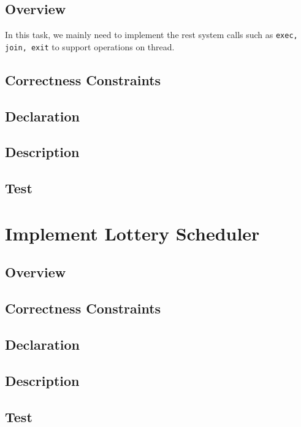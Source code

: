 \documentclass{article}
\begin{document}
\subsection{Overview}
In this task, we mainly need to implement the rest system calls such as \texttt{exec, join, exit} to support operations on thread.
\subsection{Correctness Constraints}
\begin{compactitem}
\item
\item
\end{compactitem}
\subsection{Declaration}
\subsection{Description}
\subsection{Test}

\section{Implement Lottery Scheduler}
\subsection{Overview}
\subsection{Correctness Constraints}
\subsection{Declaration}
\subsection{Description}
\subsection{Test}
\end{document}
